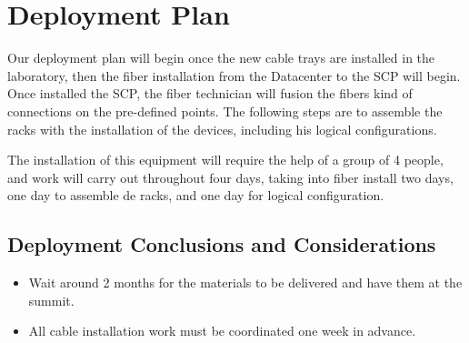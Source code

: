 \newpage

\section{Deployment Plan}

Our deployment plan will begin once the new cable trays are installed in the laboratory, then the fiber installation from the Datacenter to the SCP will begin.
Once installed the SCP, the fiber technician will fusion the fibers kind of connections on the pre-defined points.
The following steps are to assemble the racks with the installation of the devices, including his logical configurations.


The installation of this equipment will require the help of a group of 4 people, and work will carry out throughout four days, 
taking into fiber install two days, one day to assemble de racks, and one day for logical configuration. 

\subsection{Deployment Conclusions and Considerations}

\begin{itemize}
    \item Wait around 2 months for the materials to be delivered and have them at the summit.
    \item All cable installation work must be coordinated one week in advance.
\end{itemize}


